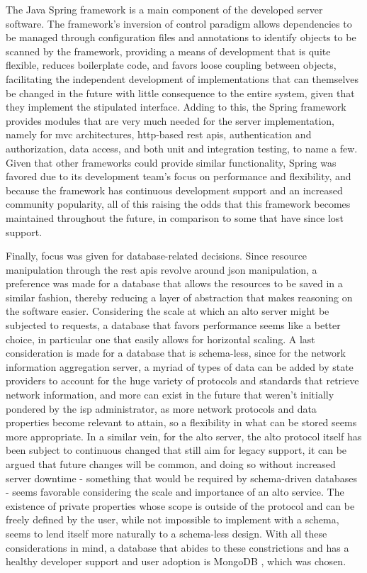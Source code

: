     The Java Spring framework \cite{java-spring} is a main component of the developed server software. 
    The framework's inversion of control paradigm allows dependencies to be managed through configuration files and annotations to identify objects to be scanned by the framework, providing a means of development that is quite flexible, reduces boilerplate code, and favors loose coupling between objects, facilitating the independent development of implementations that can themselves be changed in the future with little consequence to the entire system, given that they implement the stipulated interface.
    Adding to this, the Spring framework provides modules that are very much needed for the server implementation, namely for \gls{mvc} architectures, \gls{http}-based \gls{rest} \glspl{api}, authentication and authorization, data access, and both unit and integration testing, to name a few.
    Given that other frameworks could provide similar functionality, Spring was favored due to its development team's focus on performance and flexibility, and because the framework has continuous development support and an increased community popularity, all of this raising the odds that this framework becomes maintained throughout the future, in comparison to some that have since lost support.

    Finally, focus was given for database-related decisions.
    Since resource manipulation through the \gls{rest} \glspl{api} revolve around \gls{json} manipulation, a preference was made for a database that allows the resources to be saved in a similar fashion, thereby reducing a layer of abstraction that makes reasoning on the software easier.
    Considering the scale at which an \gls{alto} server might be subjected to requests, a database that favors performance seems like a better choice, in particular one that easily allows for horizontal scaling.
    A last consideration is made for a database that is schema-less, since for the network information aggregation server, a myriad of types of data can be added by state providers to account for the huge variety of protocols and standards that retrieve network information, and more can exist in the future that weren't initially pondered by the \gls{isp} administrator, as more network protocols and data properties become relevant to attain, so a flexibility in what can be stored seems more appropriate.
    In a similar vein, for the \gls{alto} server, the \gls{alto} protocol itself has been subject to continuous changed that still aim for legacy support, it can be argued that future changes will be common, and doing so without increased server downtime - something that would be required by schema-driven databases - seems favorable considering the scale and importance of an \gls{alto} service.
    The existence of private properties whose scope is outside of the protocol and can be freely defined by the user, while not impossible to implement with a schema, seems to lend itself more naturally to a schema-less design.
    With all these considerations in mind, a database that abides to these constrictions and has a healthy developer support and user adoption is MongoDB \cite{mongodb}, which was chosen.

